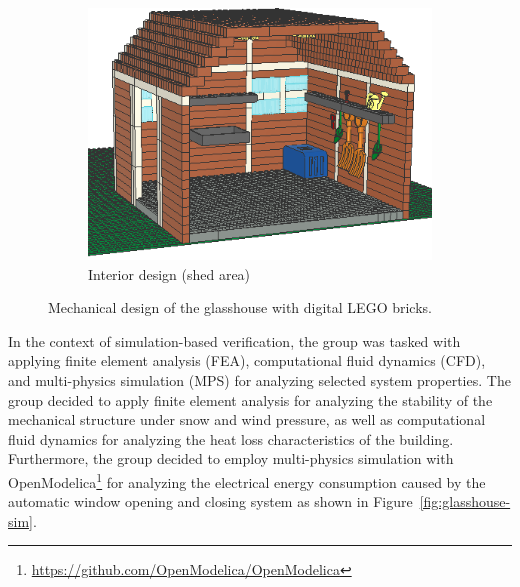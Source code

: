 \documentclass{PDS}
\begin{document}
\begin{figure}[htbp]
\begin{subfigure}[b]{0.32\textwidth}
        \includegraphics[width=\textwidth]{./figures/glasshouse_3.png}
        \caption{Interior design (shed area)}
        \label{fig:glasshouse_3}
    \end{subfigure}
    \caption{Mechanical design of the glasshouse with digital LEGO bricks.}
    \label{fig:glasshouse}
\end{figure}

In the context of simulation-based verification, the group was tasked with applying finite element analysis (FEA), computational fluid dynamics (CFD), and multi-physics simulation (MPS) for analyzing selected system properties.
The group decided to apply finite element analysis for analyzing the stability of the mechanical structure under snow and wind pressure, as well as computational fluid dynamics for analyzing the heat loss characteristics of the building.
Furthermore, the group decided to employ multi-physics simulation with OpenModelica\footnote{\url{https://github.com/OpenModelica/OpenModelica}} for analyzing the electrical energy consumption caused by the automatic window opening and closing system as shown in Figure~\ref{fig:glasshouse-sim}.
\end{document}
